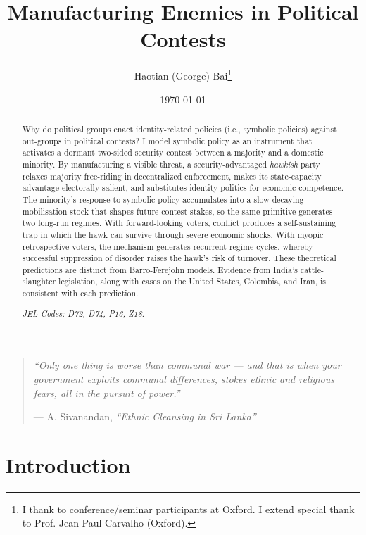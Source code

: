 \documentclass[11pt,twoside]{extarticle}
\title{Manufacturing Enemies in Political Contests}
\author{Haotian (George) Bai\thanks{I thank to conference/seminar participants at Oxford. I extend special thank to Prof. Jean-Paul Carvalho (Oxford).}}
\date{\today}
\begin{document}
\maketitle

\begin{abstract}
Why do political groups enact identity-related policies (i.e., symbolic policies) against out-groups in political contests? I model symbolic policy as an instrument that activates a dormant two-sided security contest between a majority and a domestic minority. By manufacturing a visible threat, a security-advantaged \emph{hawkish} party relaxes majority free-riding in decentralized enforcement, makes its state-capacity advantage electorally salient, and substitutes identity politics for economic competence.
The minority's response to symbolic policy accumulates into a slow-decaying mobilisation stock that shapes future contest stakes, so the same primitive generates two long-run regimes. With forward-looking voters, conflict produces a self-sustaining trap in which the hawk can survive through severe economic shocks. With myopic retrospective voters, the mechanism generates recurrent regime cycles, whereby successful suppression of disorder raises the hawk's risk of turnover. These theoretical predictions are distinct from Barro-Ferejohn models. Evidence from India's cattle-slaughter legislation, along with cases on the United States, Colombia, and Iran, is consistent with each prediction.

\emph{JEL Codes: D72, D74, P16, Z18}.

\end{abstract}
\clearpage

\begin{quote}
\textit{``Only one thing is worse than communal war --- and that is when your government exploits communal differences, stokes ethnic and religious fears, all in the pursuit of power.''}

\hfill --- A. Sivanandan, \textit{``Ethnic Cleansing in Sri Lanka''}
\end{quote}

\section{Introduction}

\end{document}
